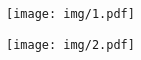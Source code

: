 \begin{figure}
    \centering
    \texttt{[image: img/1.pdf]}
\end{figure}
\begin{figure}
    \centering
    \texttt{[image: img/2.pdf]}
\end{figure}